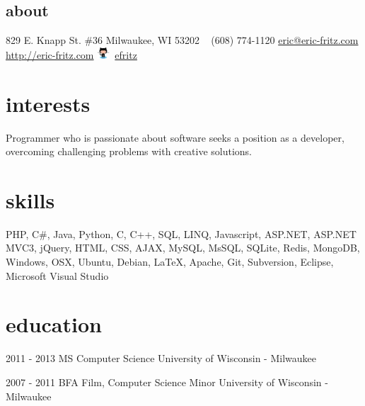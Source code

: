 \documentclass[]{fritz-resume}
\begin{document}


\begin{aside}
	\section{about}
		829 E. Knapp St. \#36
		Milwaukee, WI 53202
		~
		(608) 774-1120
		\href{mailto:eric@eric-fritz.com?subject=resume}{eric@eric-fritz.com}
		\href{http://eric-fritz.com}{http://eric-fritz.com}
		\includegraphics[height=12pt]{github.eps}~\href{http://github.com/efritz}{efritz}
\end{aside}


\section{interests}

{\small Programmer who is passionate about software seeks a position as a developer, overcoming challenging problems with creative solutions.}


\section{skills}

{\small PHP, C\#, Java, Python, C, C++, SQL, LINQ, Javascript, ASP.NET, ASP.NET MVC3, jQuery, HTML, CSS, AJAX, MySQL, MsSQL, SQLite, Redis, MongoDB, Windows, OSX, Ubuntu, Debian, \LaTeX{}, Apache, Git, Subversion, Eclipse, Microsoft Visual Studio}


\section{education}

\begin{entrylist}
	\entry
		{2011 - 2013}
		{MS Computer Science}
		{University of Wisconsin - Milwaukee}
		{
			 \\
		}
	
	\entry
		{2007 - 2011}
		{BFA Film, Computer Science Minor}
		{University of Wisconsin - Milwaukee}
		{
			 \\
		}
\end{entrylist}
\end{document}
